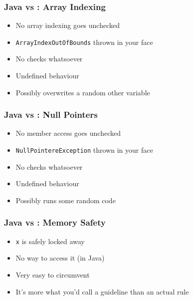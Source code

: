 \begin{frame}
  \frametitle{Java vs \cpp: Array Indexing}
  \begin{itemize}
    \item No array indexing goes unchecked
    \item \texttt{ArrayIndexOutOfBounds} thrown in your face
  \end{itemize}
  \vskip2mm
  \structure{\cpp}
  \begin{itemize}
    \item No checks whatsoever
    \item Undefined behaviour
    \item Possibly overwrites a random other variable
  \end{itemize}
\end{frame}

\begin{frame}
  \frametitle{Java vs \cpp: Null Pointers}
  \begin{itemize}
    \item No member access goes unchecked
    \item \texttt{NullPointereException} thrown in your face
  \end{itemize}
  \vskip2mm
  \structure{\cpp}
  \begin{itemize}
    \item No checks whatsoever
    \item Undefined behaviour
    \item Possibly runs some random code
  \end{itemize}
\end{frame}

\begin{frame}
  \frametitle{Java vs \cpp: Memory Safety}
  \begin{itemize}
    \item \texttt{x} is safely locked away
    \item No way to access it (in Java)
  \end{itemize}
  \vskip2mm
  \structure{\cpp}
  \begin{itemize}
    \item Very easy to circumvent
    \item It's more what you'd call a guideline than an actual rule
  \end{itemize}
\end{frame}

